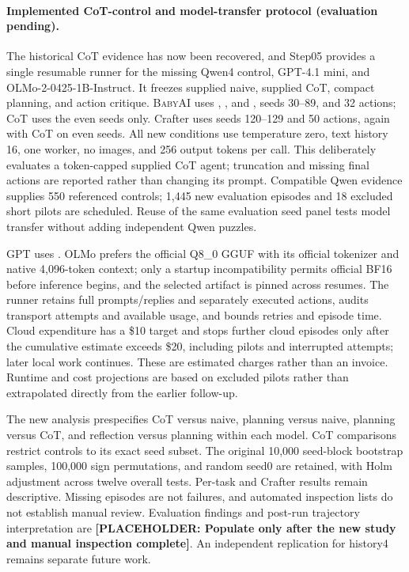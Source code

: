 \documentclass[11pt,a4paper]{article}
\newcommand{\missing}[1]{\textbf{[PLACEHOLDER: #1]}}
\newcommand{\BabyAI}{\textsc{BabyAI}}
\begin{document}
\paragraph{Implemented CoT-control and model-transfer protocol (evaluation pending).} The historical CoT evidence has now been recovered, and Step05 provides a single resumable runner for the missing Qwen4 control, GPT-4.1 mini, and OLMo-2-0425-1B-Instruct. It freezes supplied naive, supplied CoT, compact planning, and action critique. \BabyAI{} uses , , and , seeds 30--89, and 32 actions; CoT uses the even seeds only. Crafter uses seeds 120--129 and 50 actions, again with CoT on even seeds. All new conditions use temperature zero, text history 16, one worker, no images, and 256 output tokens per call. This deliberately evaluates a token-capped supplied CoT agent; truncation and missing final actions are reported rather than changing its prompt. Compatible Qwen evidence supplies 550 referenced controls; 1,445 new evaluation episodes and 18 excluded short pilots are scheduled. Reuse of the same evaluation seed panel tests model transfer without adding independent Qwen puzzles.

GPT uses . OLMo prefers the official Q8\_0 GGUF with its official tokenizer and native 4,096-token context; only a startup incompatibility permits official BF16 before inference begins, and the selected artifact is pinned across resumes. The runner retains full prompts/replies and separately executed actions, audits transport attempts and available usage, and bounds retries and episode time. Cloud expenditure has a \$10 target and stops further cloud episodes only after the cumulative estimate exceeds \$20, including pilots and interrupted attempts; later local work continues. These are estimated charges rather than an invoice. Runtime and cost projections are based on excluded pilots rather than extrapolated directly from the earlier follow-up.

The new analysis prespecifies CoT versus naive, planning versus naive, planning versus CoT, and reflection versus planning within each model. CoT comparisons restrict controls to its exact seed subset. The original 10,000 seed-block bootstrap samples, 100,000 sign permutations, and random seed0 are retained, with Holm adjustment across twelve overall tests. Per-task and Crafter results remain descriptive. Missing episodes are not failures, and automated inspection lists do not establish manual review. Evaluation findings and post-run trajectory interpretation are \missing{Populate only after the new study and manual inspection complete}. An independent  replication for history4 remains separate future work.
\end{document}
